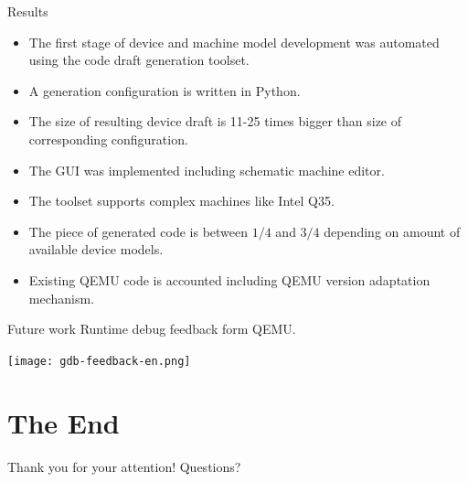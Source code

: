\documentclass[unicode,hyperref={unicode=true},aspectratio=169]{beamer}
\newcommand*{\sectionpagekb}{\usebeamertemplate*{section page kb}}
\begin{document}
\begin{frame}{Results}
\begin{itemize}
\item The first stage of device and machine model development was automated
using the code draft generation toolset.
\item A generation configuration is written in Python.
\item The size of resulting device draft is 11-25 times bigger than size of
corresponding configuration.
\item The GUI was implemented including schematic machine editor.
\item The toolset supports complex machines like Intel Q35.
\item The piece of generated code is between \(1/4\) and \(3/4\) depending on
amount of available device models.
\item Existing QEMU code is accounted including QEMU version adaptation
mechanism.
\end{itemize}
\end{frame}



\begin{frame}{Future work}
Runtime debug feedback form QEMU.
\vfill
\begin{center}
\texttt{[image: gdb-feedback-en.png]}
\end{center}
\end{frame}



\section{The End}
\begin{frame}{}
\begin{center}
\vfill
\sectionpagekb
\vfill
Thank you for your attention!
\vfill
Questions?
\vfill
\end{center}
\end{frame}
\end{document}
